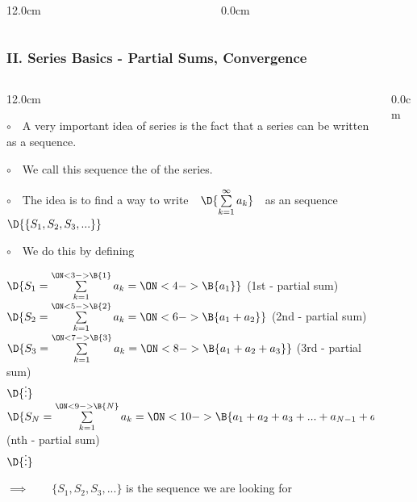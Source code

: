 \begin{frame}
\begin{columns}
\begin{column}{12.0cm}
\end{column}
\begin{column}{0.0cm}\end{column}
\end{columns}
\end{frame}

\begin{frame}
\frametitle{II. Series Basics - Partial Sums, Convergence}
\scriptsize
\begin{columns}
\begin{column}{12.0cm}

$\circ$ \,\, A very important idea of series is the fact that a series can be written as a sequence. 

\vspace{0.3cm}

$\circ$ \,\, We call this sequence the \quad{}\quad of the series.

\vspace{0.1cm}

$\circ$ \,\, The idea is to find a way to write \,\, $\D{\sum \limits_{k = 1}^{\infty} a_k}$ \,\, as an sequence $\D{\{S_1, S_2, S_3, ...\}}$\\

\vspace{0.1cm}

$\circ$ \,\, We do this by defining 

\qquad $\D{S_1 = \sum \limits_{k = 1}^{\ON<3->{\B{1}}} a_k = \ON<4->{\B{a_1}}}$ \hspace{4.4cm}(1st - partial sum) \\
\qquad $\D{S_2 = \sum \limits_{k = 1}^{\ON<5->{\B{2}}} a_k = \ON<6->{\B{a_1 + a_2}}}$ \hspace{3.8cm}(2nd - partial sum)\\
\qquad $\D{S_3 = \sum \limits_{k = 1}^{\ON<7->{\B{3}}} a_k = \ON<8->{\B{a_1 + a_2 + a_3}}}$ \hspace{3.2cm}(3rd - partial sum)\\
\qquad \quad $\D{\vdots}$\\
\qquad $\D{S_N = \sum \limits_{k = 1}^{\ON<9->{\B{N}}} a_k = \ON<10->{\B{a_1 + a_2 + a_3 + ... + a_{N-1} + a_N}}}$ \hspace{1.0cm}(nth - partial sum)\\
\qquad \quad $\D{\vdots}$ \\

\vspace{0.2cm}

\qquad $\implies \qquad \{S_1, S_2, S_3, ... \}$ \qquad is the sequence we are looking for

\end{column}
\begin{column}{0.0cm}\end{column}
\end{columns}
\end{frame}

